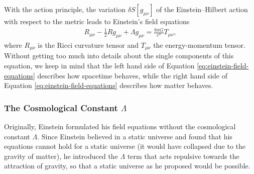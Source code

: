 \noindent With the action principle, the variation $\delta S[g_{\mu\nu}]$ of the Einstein--Hilbert action with respect to the metric leads to Einstein's field equations
\begin{align}
    R_{\mu\nu} - \frac{1}{2}R g_{\mu\nu} + \Lambda g_{\mu\nu} = \frac{8\pi G}{c^4}T_{\mu \nu}, \label{eq:einstein-field-equations}
\end{align}
where $R_{\mu\nu}$ is the Ricci curvature tensor and $T_{\mu\nu}$ the energy-momentum tensor. \\
\noindent Without getting too much into details about the single components of this equation, we keep in mind that the left hand side of Equation \eqref{eq:einstein-field-equations} describes how spacetime behaves, while the right hand side of Equation \eqref{eq:einstein-field-equations} describes how matter behaves.

\subsubsection{The Cosmological Constant $\Lambda$}

\noindent Originally, Einstein formulated his field equations without the cosmological constant $\Lambda$. Since Einstein believed in a static universe and found that his equations cannot hold for a static universe (it would have collapsed due to the gravity of matter), he introduced the $\Lambda$ term that acts repulsive towards the attraction of gravity, so that a static universe as he proposed would be possible. \\

